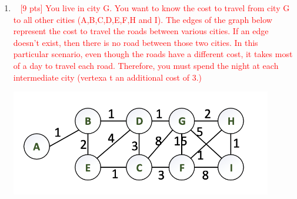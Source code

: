 \documentclass[12pt]{article}
\newenvironment{sol}[1][Solution]{\begin{trivlist}\item[\hskip\labelsep {\bfseries #1:}]}{\end{trivlist}}
\begin{document}
\begin{enumerate}
    \item \ \textcolor{red}{ [9 pts] You live in city G. You want to know the cost to travel from city G to all other cities (A,B,C,D,E,F‚H and I). The edges of the graph below represent the cost to travel the roads between various cities. If an edge doesn't exist, then there is no road between those two cities. In this particular scenario, even though the roads have a different cost, it takes most of a day to travel each road. Therefore, you must spend the night at each intermediate city (vertexa t an additional cost of 3.)}
    \begin{center}
            \includegraphics[width = 0.9\textwidth]{p11.png}
    \end{center}
\end{enumerate}
\end{document}
